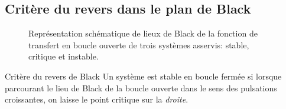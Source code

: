 \subsection{Critère du revers dans le plan de Black
}
\acpl
\begin{figure}[!h]
    \centering
    
    \caption{Représentation schématique de lieux de Black de la 
             fonction de transfert en boucle ouverte de trois systèmes 
             asservis: stable, critique et instable.
             \label{fig-black_revers}}
\end{figure}
\begin{criteria}{Critère du revers de Black}
    Un système est stable en boucle fermée si lorsque parcourant 
    le lieu de Black de la boucle ouverte dans le sens des 
    pulsations croissantes, on laisse le point critique sur 
    la \emph{droite}.
\end{criteria}
